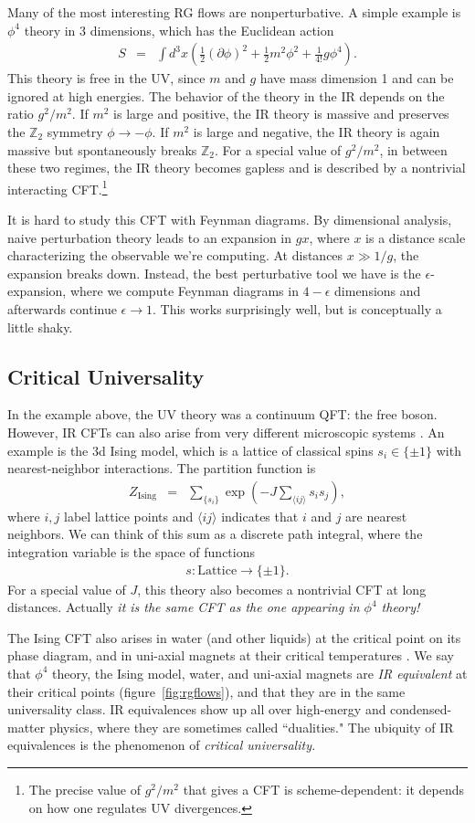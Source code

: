 \documentclass[11pt]{ws-rv9x6}
\newcommand\be{\begin{eqnarray}}
\newcommand\ee{\end{eqnarray}}
\newcommand\f\phi
\newcommand\p[1]{\left(#1\right)}
\newcommand\ptl\partial
\newcommand\e\epsilon
\newcommand\<\langle
\renewcommand\>\rangle
\newcommand\Z{\mathbb{Z}}
\renewcommand\.{\cdot}
\begin{document}
Many of the most interesting RG flows are nonperturbative. A simple example is $\f^4$ theory in 3 dimensions, which has the Euclidean action
\be
S&=&\int d^3 x\p{\frac 1 2(\ptl\phi)^2 + \frac 1 2 m^2 \phi^2 + \frac 1 {4!}g \phi^4}.
\ee
This theory is free in the UV, since $m$ and $g$ have mass dimension 1 and can be ignored at high energies.  The behavior of the theory in the IR depends on the ratio $g^2/m^2$.  If $m^2$ is large and positive, the IR theory is massive and preserves the $\Z_2$ symmetry $\phi\to -\phi$.  If $m^2$ is large and negative, the IR theory is again massive but spontaneously breaks $\Z_2$.  For a special value of $g^2/m^2$, in between these two regimes, the IR theory becomes gapless and is described by a nontrivial interacting CFT.\footnote{The precise value of $g^2/m^2$ that gives a CFT is scheme-dependent: it depends on how one regulates UV divergences.}

It is hard to study this CFT with Feynman diagrams.  By dimensional analysis, naive perturbation theory leads to an expansion in $gx$, where $x$ is a distance scale characterizing the observable we're computing.  At distances $x\gg 1/g$, the expansion breaks down.  Instead, the best perturbative tool we have is the $\e$-expansion, where we compute Feynman diagrams in $4-\e$ dimensions and afterwards continue $\e\to 1$.  This works surprisingly well, but is conceptually a little shaky.  

\subsection{Critical Universality}

In the example above, the UV theory was a continuum QFT: the free boson.  However, IR CFTs can also arise from very different microscopic systems \cite{Polyakov:1970xd}.  An example is the 3d Ising model, which is a lattice of classical spins $s_i \in \{\pm 1\}$ with nearest-neighbor interactions.  The partition function is
\be
Z_\mathrm{Ising} &=& \sum_{\{s_i\}} \exp\p{-J \sum_{\<ij\>} s_i s_j},
\ee
where $i,j$ label lattice points and $\<ij\>$ indicates that $i$ and $j$ are nearest neighbors.
We can think of this sum as a discrete path integral, where the integration variable is the space of functions
\be
s: \mathrm{Lattice} \to \{\pm 1\}.
\ee
For a special value of $J$, this theory also becomes a nontrivial CFT at long distances. Actually {\it it is the same CFT as the one appearing in $\phi^4$ theory!\/}

The Ising CFT also arises in water (and other liquids) at the critical point on its phase diagram, and in uni-axial magnets at their critical temperatures \cite{Cardy:1996xt}. We say that $\phi^4$ theory, the Ising model, water, and uni-axial magnets are {\it IR equivalent\/} at their critical points (figure~\ref{fig:rgflows}), and that they are in the same universality class.  IR equivalences show up all over high-energy and condensed-matter physics, where they are sometimes called ``dualities."  The ubiquity of IR equivalences is the phenomenon of {\it critical universality.} 
\end{document}
